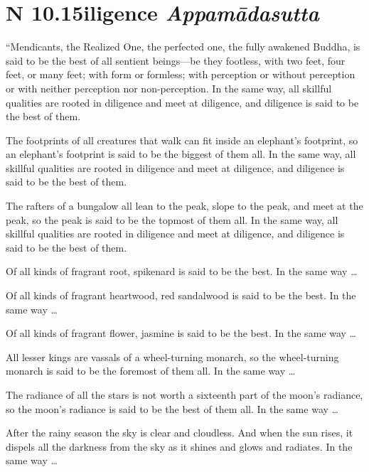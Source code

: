 \documentclass[12pt,openany]{book}%
\newcommand*{\suttatitleacronym}[1]{\smaller[2]{#1}\vspace*{.3em}}
\newcommand*{\suttatitletranslation}[1]{\linebreak{#1}}
\newcommand*{\suttatitleroot}[1]{\linebreak\smaller[2]\itshape{#1}}
\newcommand*{\tocacronym}[1]{\hspace*{-3.3em}{#1}\quad}
\newcommand*{\toctranslation}[1]{#1}
\newcommand*{\tocroot}[1]{(\textit{#1})}
\begin{document}
%
\section*{{\suttatitleacronym AN 10.15}{\suttatitletranslation Diligence }{\suttatitleroot Appamādasutta}}
\addcontentsline{toc}{section}{\tocacronym{AN 10.15} \toctranslation{Diligence } \tocroot{Appamādasutta}}

“Mendicants, the Realized One, the perfected one, the fully awakened Buddha, is said to be the best of all sentient beings—be they footless, with two feet, four feet, or many feet; with form or formless; with perception or without perception or with neither perception nor non-perception. In the same way, all skillful qualities are rooted in diligence and meet at diligence, and diligence is said to be the best of them. 

The footprints of all creatures that walk can fit inside an elephant’s footprint, so an elephant’s footprint is said to be the biggest of them all. In the same way, all skillful qualities are rooted in diligence and meet at diligence, and diligence is said to be the best of them. 

The rafters of a bungalow all lean to the peak, slope to the peak, and meet at the peak, so the peak is said to be the topmost of them all. In the same way, all skillful qualities are rooted in diligence and meet at diligence, and diligence is said to be the best of them. 

Of all kinds of fragrant root, spikenard is said to be the best. In the same way … 

Of all kinds of fragrant heartwood, red sandalwood is said to be the best. In the same way … 

Of all kinds of fragrant flower, jasmine is said to be the best. In the same way … 

All lesser kings are vassals of a wheel-turning monarch, so the wheel-turning monarch is said to be the foremost of them all. In the same way … 

The radiance of all the stars is not worth a sixteenth part of the moon’s radiance, so the moon’s radiance is said to be the best of them all. In the same way … 

After the rainy season the sky is clear and cloudless. And when the sun rises, it dispels all the darkness from the sky as it shines and glows and radiates. In the same way … 
\end{document}
